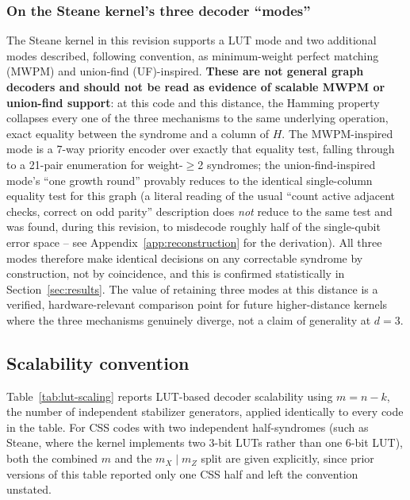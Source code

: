 \subsubsection*{On the Steane kernel's three decoder ``modes''}
The Steane kernel in this revision supports a LUT mode and two additional modes described, following convention, as minimum-weight perfect matching (MWPM) and union-find (UF)-inspired. \textbf{These are not general graph decoders and should not be read as evidence of scalable MWPM or union-find support}: at this code and this distance, the Hamming property collapses every one of the three mechanisms to the same underlying operation, exact equality between the syndrome and a column of \(H\). The MWPM-inspired mode is a 7-way priority encoder over exactly that equality test, falling through to a 21-pair enumeration for weight-\(\ge\)2 syndromes; the union-find-inspired mode's ``one growth round'' provably reduces to the identical single-column equality test for this graph (a literal reading of the usual ``count active adjacent checks, correct on odd parity'' description does \emph{not} reduce to the same test and was found, during this revision, to misdecode roughly half of the single-qubit error space -- see Appendix~\ref{app:reconstruction} for the derivation). All three modes therefore make identical decisions on any correctable syndrome by construction, not by coincidence, and this is confirmed statistically in Section~\ref{sec:results}. The value of retaining three modes at this distance is a verified, hardware-relevant comparison point for future higher-distance kernels where the three mechanisms genuinely diverge, not a claim of generality at \(d=3\).

\subsection{Scalability convention}\label{subsec:scaling-convention}

Table~\ref{tab:lut-scaling} reports LUT-based decoder scalability using \(m=n-k\), the number of independent stabilizer generators, applied identically to every code in the table. For CSS codes with two independent half-syndromes (such as Steane, where the kernel implements two 3-bit LUTs rather than one 6-bit LUT), both the combined \(m\) and the \(m_X\mid m_Z\) split are given explicitly, since prior versions of this table reported only one CSS half and left the convention unstated.


